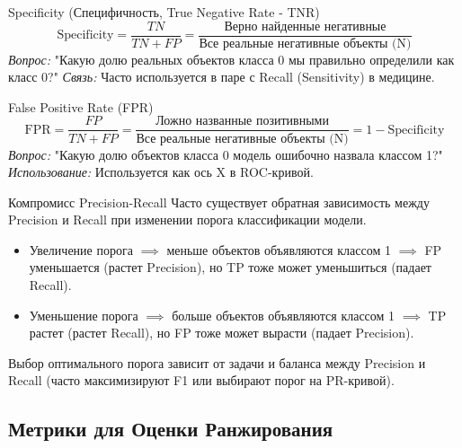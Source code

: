 \begin{textbox}{{Specificity (Специфичность, True Negative Rate - TNR)}}
     \[ \text{Specificity} = \frac{TN}{TN + FP} = \frac{\text{Верно найденные негативные}}{\text{Все реальные негативные объекты (N)}} \]
    \textit{Вопрос:} "Какую долю реальных объектов класса 0 мы правильно определили как класс 0?"
    \textit{Связь:} Часто используется в паре с Recall (Sensitivity) в медицине.
\end{textbox}

\begin{textbox}{{False Positive Rate (FPR)}}
    \[ \text{FPR} = \frac{FP}{TN + FP} = \frac{\text{Ложно названные позитивными}}{\text{Все реальные негативные объекты (N)}} = 1 - \text{Specificity} \]
    \textit{Вопрос:} "Какую долю объектов класса 0 модель ошибочно назвала классом 1?"
    \textit{Использование:} Используется как ось X в ROC-кривой.
\end{textbox}

\begin{myblock}{Компромисс Precision-Recall}
    Часто существует обратная зависимость между Precision и Recall при изменении порога классификации модели.
    \begin{itemize}[nosep, leftmargin=*]
        \item Увеличение порога $\implies$ меньше объектов объявляются классом 1 $\implies$ FP уменьшается (растет Precision), но TP тоже может уменьшиться (падает Recall).
        \item Уменьшение порога $\implies$ больше объектов объявляются классом 1 $\implies$ TP растет (растет Recall), но FP тоже может вырасти (падает Precision).
    \end{itemize}
    Выбор оптимального порога зависит от задачи и баланса между Precision и Recall (часто максимизируют F1 или выбирают порог на PR-кривой).
\end{myblock}

\subsection{Метрики для Оценки Ранжирования}

